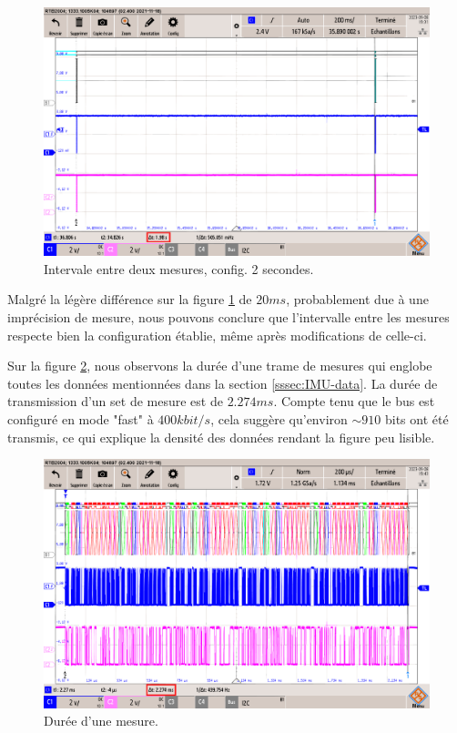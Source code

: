 \begin{figure}[H]
	\centering
	\includegraphics[width=.7\linewidth]{../figures/mesures/I2C/Intervale-2s}
	\caption{Intervale entre deux mesures, config. 2 secondes.}
	\label{fig:intervale-2s}
\end{figure}

Malgré la légère différence sur la figure \ref{fig:intervale-2s} de $20ms$, probablement due à une imprécision de mesure, nous pouvons conclure que l'intervalle entre les mesures respecte bien la configuration établie, même après modifications de celle-ci.

Sur la figure \ref{fig:duree-comm}, nous observons la durée d'une trame de mesures qui englobe toutes les données mentionnées dans la section \ref{sssec:IMU-data}. La durée de transmission d'un set de mesure est de \underline{$2.274ms$}. Compte tenu que le bus est configuré en mode "fast" à $400 kbit/s$, cela suggère qu'environ $\sim910$ bits ont été transmis, ce qui explique la densité des données rendant la figure peu lisible.

\begin{figure}[H]
	\centering
	\includegraphics[width=.7\linewidth]{../figures/mesures/I2C/duree-comm}
	\caption{Durée d'une mesure.}
	\label{fig:duree-comm}
\end{figure}

